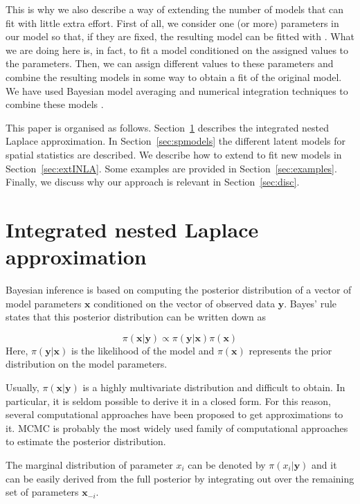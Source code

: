 \documentclass[article]{jss}
\begin{document}
This is why we also describe a way of extending the number of models that
 can fit with little extra effort. First of all, we consider one
(or more) parameters in our model so that, if they are fixed, the resulting
model can be fitted with . What we are doing here is, in fact, to
fit a model conditioned on the assigned values to the parameters. Then, we can
assign different values to these parameters and combine the resulting models in
some way to obtain a fit of the original model. We have used Bayesian model
averaging and numerical integration techniques to combine these models \citep{Bivandetal:2014}.


This paper is organised as follows. Section~\ref{sec:INLA} describes the
integrated nested Laplace approximation.  In Section~\ref{sec:spmodels} the
different latent models for spatial statistics are described.  We describe how
to extend  to fit new models in Section~\ref{sec:extINLA}. Some
examples are provided in Section~\ref{sec:examples}.  Finally, we discuss why
our approach is relevant in Section~\ref{sec:disc}.

\section{Integrated nested Laplace approximation}
\label{sec:INLA}

Bayesian inference is based on computing the posterior distribution of a
vector of model parameters $\mathbf{x}$ conditioned on the vector of observed
data $\mathbf{y}$. Bayes' rule states that this posterior distribution
can be written down as

\begin{equation}
\pi(\mathbf{x}|\mathbf{y}) \propto \pi(\mathbf{y}|\mathbf{x}) \pi(\mathbf{x})
\end{equation}
\noindent
Here, $\pi(\mathbf{y}|\mathbf{x})$ is the likelihood of the model and
$\pi(\mathbf{x})$ represents the prior distribution on the model parameters.


Usually, $\pi(\mathbf{x}|\mathbf{y})$ is a highly multivariate distribution
and difficult to obtain. In particular, it is seldom possible to derive it in
a closed form. For this reason, several computational approaches  have been 
proposed to get approximations to it. MCMC is probably the most widely used
family of computational approaches to estimate the posterior distribution.

The marginal distribution of parameter $x_i$ can be denoted by
$\pi(x_i|\mathbf{y})$ and it can be easily derived from the full posterior by
integrating out over the remaining set of parameters $\mathbf{x}_{-i}$.
\end{document}
